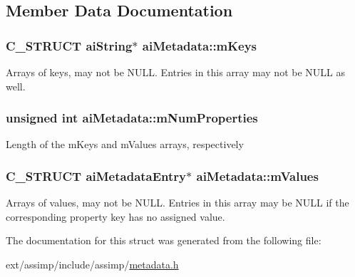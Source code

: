 \subsection{Member Data Documentation}
\hypertarget{structai_metadata_aa8c77a263443658737ee51a74e3c292e}{
\subsubsection[{m\-Keys}]{\setlength{\rightskip}{0pt plus 5cm}C\-\_\-\-S\-T\-R\-U\-C\-T {\bf ai\-String}$\ast$ ai\-Metadata\-::m\-Keys}}\label{structai_metadata_aa8c77a263443658737ee51a74e3c292e}
Arrays of keys, may not be N\-U\-L\-L. Entries in this array may not be N\-U\-L\-L as well. \hypertarget{structai_metadata_a32c4587c53dd402a5878ffc94088e528}{
\subsubsection[{m\-Num\-Properties}]{\setlength{\rightskip}{0pt plus 5cm}unsigned int ai\-Metadata\-::m\-Num\-Properties}}\label{structai_metadata_a32c4587c53dd402a5878ffc94088e528}
Length of the m\-Keys and m\-Values arrays, respectively \hypertarget{structai_metadata_a34b515fcb5b806c471d3c6ce7bc76beb}{
\subsubsection[{m\-Values}]{\setlength{\rightskip}{0pt plus 5cm}C\-\_\-\-S\-T\-R\-U\-C\-T {\bf ai\-Metadata\-Entry}$\ast$ ai\-Metadata\-::m\-Values}}\label{structai_metadata_a34b515fcb5b806c471d3c6ce7bc76beb}
Arrays of values, may not be N\-U\-L\-L. Entries in this array may be N\-U\-L\-L if the corresponding property key has no assigned value. 

The documentation for this struct was generated from the following file\-:\begin{DoxyCompactItemize}
\item 
ext/assimp/include/assimp/\hyperlink{metadata_8h}{metadata.\-h}\end{DoxyCompactItemize}
